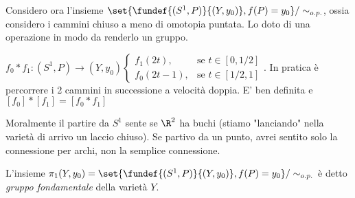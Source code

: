 Considero ora l'insieme $\set{\fundef {(S^1, P)}{(Y, y_0)}, f(P) = y_0}/\sim_{o.p.}$, ossia considero i cammini chiuso a meno di omotopia puntata.
Lo doto di una operazione in modo da renderlo un gruppo.
\begin{defn}
 $f_0 * f_1:(S^1, P)\rightarrow (Y, y_0)\begin{cases} f_1(2t), & \mbox{se } t\in \left [0, 1/2\right ] \\ f_0(2t-1), & \mbox{se }t\in \left [1/2, 1\right ]\end{cases}$.
 In pratica è percorrere i 2 cammini in successione a velocità doppia.
 E' ben definita e $\left [ f_0 \right] *\left [ f_1 \right] = \left [ f_0 * f_1 \right]$
\end{defn}
\begin{oss}
 Moralmente il partire da $S^1$ sente se $\R ^2$ ha buchi (stiamo "lanciando" nella varietà di arrivo un laccio chiuso).
 Se partivo da un punto, avrei sentito solo la connessione per archi, non la semplice connessione.
\end{oss}
\begin{defn}
 L'insieme $\pi_1(Y, y_0)=\set{\fundef{(S^1, P)}{(Y, y_0)}, f(P) = y_0}/\sim_{o.p.}$ è detto \emph{gruppo fondamentale} della varietà $Y$.
\end{defn}

